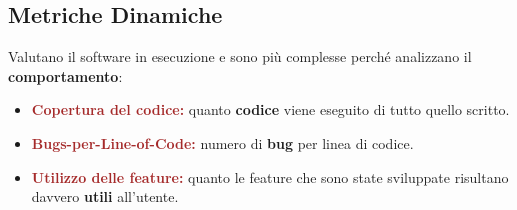 \subsection{Metriche Dinamiche}
Valutano il software in esecuzione e sono più complesse perché analizzano il \textbf{comportamento}:
\begin{itemize}
    \item \textbf{\textcolor{brown}{Copertura del codice:}} quanto \textbf{codice} viene eseguito di tutto quello scritto.
    \item \textbf{\textcolor{brown}{Bugs-per-Line-of-Code:}} numero di \textbf{bug} per linea di codice.
    \item \textbf{\textcolor{brown}{Utilizzo delle feature:}} quanto le feature che sono state sviluppate risultano davvero \textbf{utili} all'utente. 
\end{itemize}